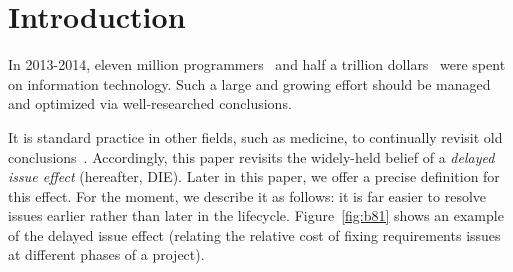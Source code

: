 \documentclass[smallcondesed]{svjour3}
\newcommand{\fig}[1]{Figure~\ref{fig:#1}}
\begin{document}
\section{Introduction}
In 2013-2014, 
eleven  million programmers~\cite{pettey14} and
half a trillion dollars~\cite{avram14} were spent on information technology.
Such a large and growing effort should be managed and optimized via  well-researched conclusions.  

It is standard practice
in other fields, such as medicine,
to continually revisit old conclusions~\cite{prasad13}.
Accordingly, this paper revisits
the widely-held belief of a {\em delayed issue effect} (hereafter, DIE).
Later in this paper, we offer a precise definition for this effect.
For the moment, we describe it as follows:
it is far easier to resolve issues earlier rather than later in the lifecycle.
 \fig{b81} shows an example of the delayed issue effect (relating
 the relative cost of fixing requirements issues at different phases of a project).
 
\end{document}
